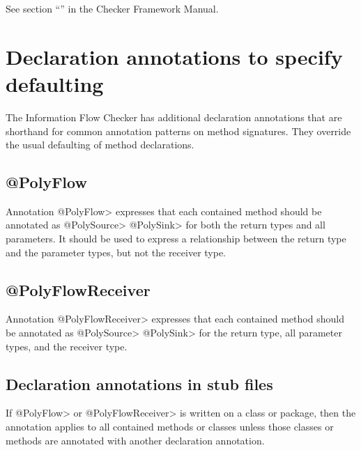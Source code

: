 See section ``'' in the Checker Framework Manual.  




\section{Declaration annotations to specify defaulting\label{sec:additionalanno}}

The Information Flow Checker has additional declaration annotations that are shorthand for common 
annotation patterns on method signatures.   They override the usual defaulting of method declarations.

\subsection{@PolyFlow\label{sec:polyflow}}

Annotation \<@PolyFlow> expresses that each contained method should be annotated as \<@PolySource> 
\<@PolySink> for both the return types and all parameters. It should be used to express a relationship 
between the return type and the parameter types, but not the receiver type.


\subsection{@PolyFlowReceiver\label{sec:polyflowreceiver}}

Annotation \<@PolyFlowReceiver> expresses that each contained method should be annotated as \<@PolySource> \<@PolySink> for the return type, all parameter types, and the receiver type.

\subsection{Declaration annotations in stub files\label{sec:declannosstubfiles}}
If \<@PolyFlow> or \<@PolyFlowReceiver> is written on a class or package, then the annotation applies
 to all contained methods or classes unless those classes or methods are annotated with another 
 declaration annotation.   

